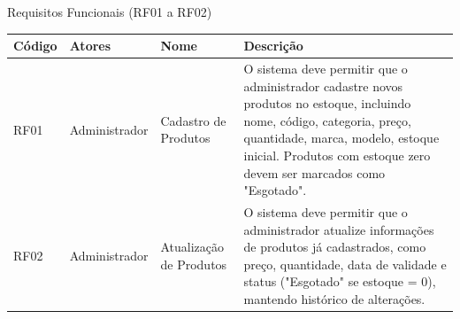 \documentclass[
	12pt,				%
	openany,			%
	twoside,			%
	a4paper,			%
	english,			%
	brazil				%
	]{abntex2}
\begin{document}
\begin{quadro}[htb]
\caption{\label{quadro_rf1}Requisitos Funcionais (RF01 a RF02)}
\begin{tabular}{|p{1.0cm}|p{2.8cm}|p{4.2cm}|p{7.0cm}|}
    \hline
    \textbf{Código} & \textbf{Atores} & \textbf{Nome} & \textbf{Descrição} \\ \hline

    RF01 & Administrador & Cadastro de Produtos & O sistema deve permitir que o administrador cadastre novos produtos no estoque, incluindo nome, código, categoria, preço, quantidade, marca, modelo, estoque inicial. Produtos com estoque zero devem ser marcados como "Esgotado". \\ \hline

    RF02 & Administrador & Atualização de Produtos & O sistema deve permitir que o administrador atualize informações de produtos já cadastrados, como preço, quantidade, data de validade e status ("Esgotado" se estoque = 0), mantendo histórico de alterações. \\ \hline

   

   

    


\end{tabular}
\end{quadro}
\end{document}
